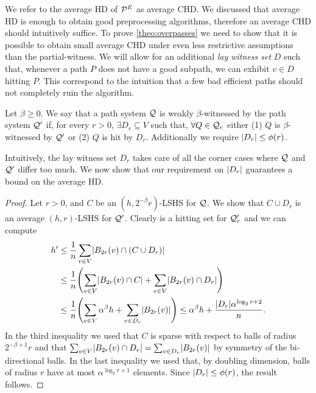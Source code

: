 We refer to the average HD of $\mathcal{P}^E$ as average CHD.
We discussed that average HD is enough to obtain good preprocessing algorithms, therefore an average CHD should intuitively suffice.
To prove \cref{theo:overpasses} we  need to show that it is possible to obtain small average CHD under even less restrictive assumptions than the partial-witness.
We will allow for an additional \emph{lay witness set} $D$ such that, whenever a path $P$ does not have a good subpath, we can exhibit $v\in D$ hitting $P$.
This correspond to the intuition that a few bad efficient paths should not completely ruin the algorithm. 

\begin{definition}
Let $\beta\geq 0$.
We say that a path system  $\mathcal{Q}$ is weakly $\beta$-witnessed by the path system $\mathcal{Q}'$ if, for every $r>0$, $\exists D_r\subseteq V$ such that, $\forall Q\in \mathcal{Q}_r$ either (1) $Q$ is $\beta$-witnessed by $\mathcal{Q}'$ or (2) $Q$ is hit by $D_r$.
Additionally we require $\lvert D_r\rvert\leq \phi(r)$.
\end{definition} 

Intuitively, the lay witness set $D_r$ takes care of all the corner cases where $\mathcal{Q}$ and $\mathcal{Q}'$ differ too much.
We now show that our requirement on $\lvert D_r\rvert$ guarantees a bound on the average HD.

\begin{proof}
Let $r>0$, and $C$ be an $(h,2^{-\beta}r)$-LSHS for $\mathcal{Q}$.
We show that $C\cup D_r$ is an average $(h,r)$-LSHS for $\mathcal{Q}'$.
Clearly is a hitting set for $\mathcal{Q}'_r$ and we can compute
\begin{align*}
h'&\leq \frac{1}{n}\sum_{v\in V} \abs{B_{2r}(v)\cap (C\cup D_r)}\\
&\leq \frac{1}{n}\prn*{\sum_{v\in V} \abs{B_{2r}(v)\cap C}+\sum_{v\in V} \abs{B_{2r}(v)\cap D_r}}\\
&\leq \frac{1}{n}\prn*{\sum_{v\in V} \alpha^\beta h+\sum_{v\in D_r} \abs{B_{2r}(v)}}
\leq \alpha^\beta h + \frac{\abs{D_r}\alpha^{\log_2r+2}}{n}.
\end{align*}
In the third inequality we used that $C$ is sparse with respect to balls of radius $2^{-\beta+1}r$ and that $\sum_{v\in V} \lvert B_{2r}(v)\cap D_r\rvert=\sum_{v\in D_r} \lvert B_{2r}(v)\rvert$ by symmetry of the bi-directional balls.
In the last inequality we used that, by doubling dimension, balls of radius $r$ have at most $\alpha^{\log_2r+1}$ elements.
Since $\lvert D_r\rvert\leq \phi(r)$, the result follows.
\end{proof}


